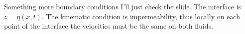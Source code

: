 \documentclass[palatino]{epflnotes}
\begin{document}
Something more boundary conditions I'll just check the slide. The interface is $z = η(x,t)$. The kinematic condition is impermeability, thus locally on each point of the interface the velocities must be the same on both fluids.

\chapter{}

\appendix

% 
\backmatter
\printindex
\end{document}
